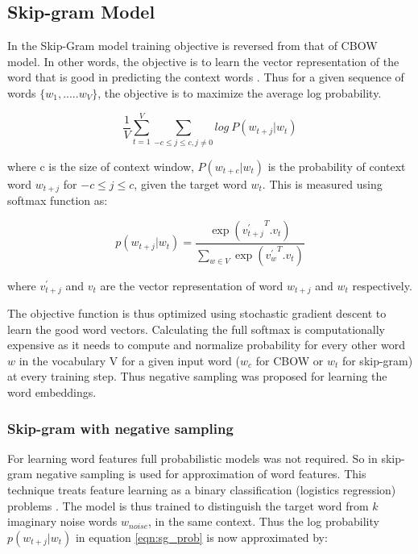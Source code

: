 \subsection{Skip-gram Model}

In the Skip-Gram model training objective is reversed from that of CBOW model. In other words, the objective is to learn the vector representation of the word that is good in predicting the context words \cite{w2v:mikolov_2013_distributed}. Thus for a given sequence of words $\{w_1,.....w_V\}$, the objective is to maximize the average log probability. 

\begin{equation}
\frac {1}{V}\sum_{t=1}^{V} \sum_{{-c \leq j \leq c},{j \neq 0}} {log\ P(w_{t+j}|w_t)}
\end{equation}

where c is the size of context window, $P(w_{t+c}|w_t)$ is the probability of context word $w_{t+j}$ for $-c \leq j \leq c$, given the target word $w_t$. This is measured using softmax function as:

\begin{equation} \label{eqn:sg_prob}
p(w_{t+j}|w_t)=\frac {\exp({{v^{'}_{t+j}}^{T}}.{v_t})}{\sum_{w {\in}V} \exp({{v^{'}_{w}}^{T}}.{v_t})}
\end{equation}

\noindent where ${v^{'}_{t+j}}$ and ${v_t}$ are the vector representation of word $w_{t+j}$ and $w_{t}$ respectively.

The objective function is thus optimized using stochastic gradient descent to learn the good word vectors. Calculating the full softmax is computationally expensive as it needs to compute and normalize probability for every other word $w$ in the vocabulary V for a given input word ($w_{c}$ for CBOW or $w_{t}$ for skip-gram) at every training step. Thus negative sampling was proposed for learning the word embeddings\cite{w2v:mikolov_2013_distributed}.

\subsubsection{Skip-gram with negative sampling}

For learning word features full probabilistic models was not required. So in skip-gram negative sampling is used for approximation of word features. This technique treats feature learning as a binary classification (logistics regression) problems \cite{w2v:mikolov_2013_distributed, w2v:tensor_flow}. The model is thus trained to distinguish the target word from $k$ imaginary noise words $w_{noise}$, in the same context. Thus the log probability $p(w_{t+j}|w_t)$ in equation \ref{eqn:sg_prob} is now approximated by:

